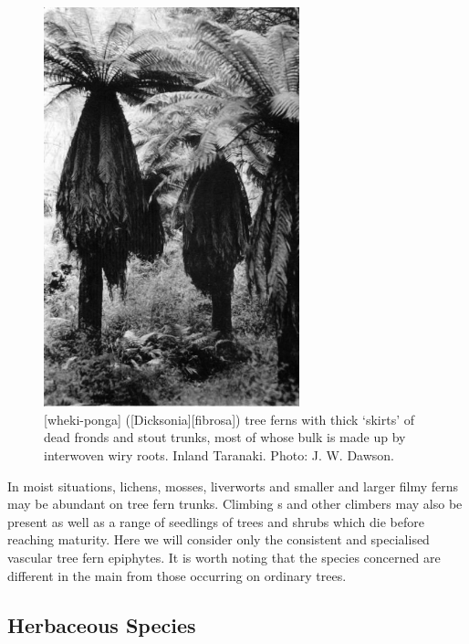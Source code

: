 \begin{figure}
	\includegraphics[width=0.66\textwidth]{graphics/fig_054}
	\centering
	\caption[Wheki-ponga (\emph{Dicksonia fibrosa}) tree ferns with thick `skirts' of dead fronds and stout trunks]{[wheki-ponga] ([Dicksonia][fibrosa]) tree ferns with thick `skirts' of dead fronds and stout trunks, most of whose bulk is made up by interwoven wiry roots.
	Inland Taranaki.
	Photo: J. W. Dawson.}%
	\label{fig:54dicksonia-fibrosa}
\end{figure}

In moist situations, lichens, mosses, liverworts and smaller and larger filmy ferns may be abundant on tree fern trunks.
Climbing s and other climbers may also be present as well as a range of seedlings of trees and shrubs which die before reaching maturity.
Here we will consider only the consistent and specialised vascular tree fern epiphytes.
It is worth noting that the species concerned are different in the main from those occurring on ordinary trees.

\subsection{Herbaceous Species}

